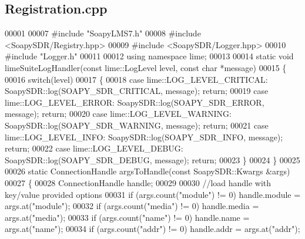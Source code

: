 \subsection{Registration.\+cpp}
\label{Registration_8cpp_source}

\begin{DoxyCode}
00001 
00007 \textcolor{preprocessor}{#include "SoapyLMS7.h"}
00008 \textcolor{preprocessor}{#include <SoapySDR/Registry.hpp>}
00009 \textcolor{preprocessor}{#include <SoapySDR/Logger.hpp>}
00010 \textcolor{preprocessor}{#include "Logger.h"}
00011 
00012 \textcolor{keyword}{using namespace }lime;
00013 
00014 \textcolor{keyword}{static} \textcolor{keywordtype}{void} limeSuiteLogHandler(\textcolor{keyword}{const} lime::LogLevel level, \textcolor{keyword}{const} \textcolor{keywordtype}{char} *message)
00015 \{
00016     \textcolor{keywordflow}{switch}(level)
00017     \{
00018     \textcolor{keywordflow}{case} lime::LOG_LEVEL_CRITICAL: SoapySDR::log(SOAPY\_SDR\_CRITICAL, message); \textcolor{keywordflow}{return};
00019     \textcolor{keywordflow}{case} lime::LOG_LEVEL_ERROR: SoapySDR::log(SOAPY\_SDR\_ERROR, message); \textcolor{keywordflow}{return};
00020     \textcolor{keywordflow}{case} lime::LOG_LEVEL_WARNING: SoapySDR::log(SOAPY\_SDR\_WARNING, message); \textcolor{keywordflow}{return};
00021     \textcolor{keywordflow}{case} lime::LOG_LEVEL_INFO: SoapySDR::log(SOAPY\_SDR\_INFO, message); \textcolor{keywordflow}{return};
00022     \textcolor{keywordflow}{case} lime::LOG_LEVEL_DEBUG: SoapySDR::log(SOAPY\_SDR\_DEBUG, message); \textcolor{keywordflow}{return};
00023     \}
00024 \}
00025 
00026 \textcolor{keyword}{static} ConnectionHandle argsToHandle(\textcolor{keyword}{const} SoapySDR::Kwargs &args)
00027 \{
00028     ConnectionHandle handle;
00029 
00030     \textcolor{comment}{//load handle with key/value provided options}
00031     \textcolor{keywordflow}{if} (args.count(\textcolor{stringliteral}{"module"}) != 0) handle.module = args.at(\textcolor{stringliteral}{"module"});
00032     \textcolor{keywordflow}{if} (args.count(\textcolor{stringliteral}{"media"}) != 0) handle.media = args.at(\textcolor{stringliteral}{"media"});
00033     \textcolor{keywordflow}{if} (args.count(\textcolor{stringliteral}{"name"}) != 0) handle.name = args.at(\textcolor{stringliteral}{"name"});
00034     \textcolor{keywordflow}{if} (args.count(\textcolor{stringliteral}{"addr"}) != 0) handle.addr = args.at(\textcolor{stringliteral}{"addr"});

\end{DoxyCode}
